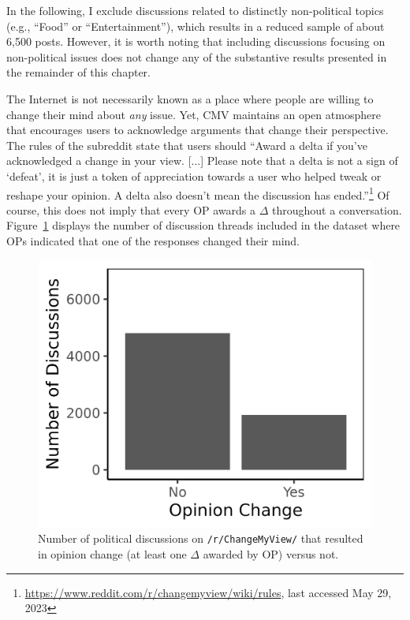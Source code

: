 In the following, I exclude discussions related to distinctly non-political topics (e.g., ``Food'' or ``Entertainment''), which results in a reduced sample of about 6,500 posts. However, it is worth noting that including discussions focusing on non-political issues does not change any of the substantive results presented in the remainder of this chapter.

The Internet is not necessarily known as a place where people are willing to change their mind about \textit{any} issue. Yet, CMV maintains an open atmosphere that encourages users to acknowledge arguments that change their perspective. The rules of the subreddit state that users should ``Award a delta if you've acknowledged a change in your view. [...] Please note that a delta is not a sign of `defeat', it is just a token of appreciation towards a user who helped tweak or reshape your opinion. A delta also doesn't mean the discussion has ended.''\footnote{ \url{https://www.reddit.com/r/changemyview/wiki/rules}, last accessed May 29, 2023} Of course, this does not imply that every OP awards a $\Delta$ throughout a conversation. Figure~\ref{fig:delta} displays the number of discussion threads included in the dataset where OPs indicated that one of the responses changed their mind.

\begin{figure}[ht]
\centering
\includegraphics{fig2-delta_political.png}
\caption[Number of original posts on \texttt{/r/ChangeMyView/} that resulted in opinion change]{Number of political discussions on \texttt{/r/ChangeMyView/} that resulted in opinion change (at least one $\Delta$ awarded by OP) versus not.}\label{fig:delta}
\end{figure}

